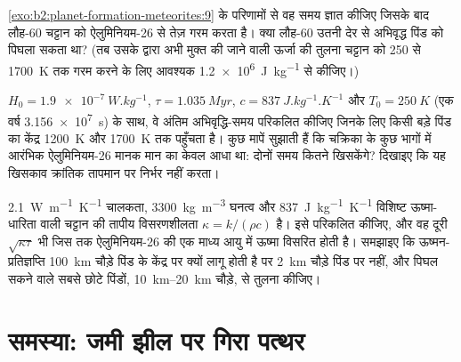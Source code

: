 \begin{exercise}[$\star\star\star$]\label{exo:b2:planet-formation-meteorites:10}
\cref{exo:b2:planet-formation-meteorites:9} के परिणामों से वह समय ज्ञात कीजिए जिसके बाद लौह-60 चट्टान को
ऐलुमिनियम-26 से तेज़ गरम करता है। क्या लौह-60 उतनी देर से अभिवृद्ध पिंड को
पिघला सकता था? (तब उसके द्वारा अभी मुक्त की जाने वाली ऊर्जा की तुलना चट्टान को \num{250} से \qty{1700}{K} तक
गरम करने के लिए आवश्यक \qty{1.2e6}{J.kg^{-1}} से कीजिए।)
\end{exercise}

\begin{exercise}[$\star\star\star$]\label{exo:b2:planet-formation-meteorites:11}
$H_0 = \qty{1.9e-7}{W.kg^{-1}}$, $\tau = \qty{1.035}{Myr}$,
$c = \qty{837}{J.kg^{-1}.K^{-1}}$ और $T_0 = \qty{250}{K}$ (एक वर्ष
\qty{3.156e7}{s}) के साथ, वे अंतिम अभिवृद्धि-समय परिकलित कीजिए जिनके लिए किसी
बड़े पिंड का केंद्र \qty{1200}{K} और \qty{1700}{K} तक पहुँचता है। कुछ मापें सुझाती हैं कि
चक्रिका के कुछ भागों में आरंभिक ऐलुमिनियम-26 मानक मान का केवल आधा था:
दोनों समय कितने खिसकेंगे? दिखाइए कि यह खिसकाव
क्रांतिक तापमान पर निर्भर नहीं करता।
\end{exercise}

\begin{exercise}[$\star\star\star$]\label{exo:b2:planet-formation-meteorites:12}
\qty{2.1}{W.m^{-1}.K^{-1}} चालकता, \qty{3300}{kg.m^{-3}}
घनत्व और \qty{837}{J.kg^{-1}.K^{-1}} विशिष्ट ऊष्मा-धारिता वाली चट्टान की
तापीय विसरणशीलता $\kappa = k/(\rho c)$ है। इसे परिकलित कीजिए, और वह दूरी
$\sqrt{\kappa\tau}$ भी जिस तक ऐलुमिनियम-26 की एक माध्य आयु में ऊष्मा विसरित होती है।
समझाइए कि ऊष्मन-प्रतिज्ञप्ति \qty{100}{km} चौड़े पिंड के केंद्र पर क्यों लागू होती है
पर \qty{2}{km} चौड़े पिंड पर नहीं, और पिघल सकने वाले सबसे छोटे पिंडों,
\qtyrange{10}{20}{km} चौड़े, से तुलना कीजिए।
\end{exercise}

\section{समस्या: जमी झील पर गिरा पत्थर}


